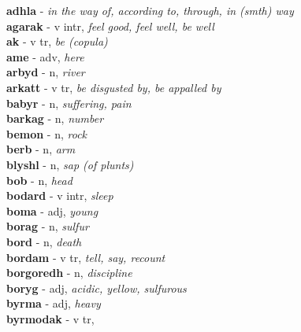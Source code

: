 \textbf{adhla}   - \emph{in the way of, according to, through, in (smth) way}\\ \vspace{7pt}\textbf{agarak}   - v intr, \emph{feel good, feel well, be well}\\ \vspace{7pt}\textbf{ak}   - v tr, \emph{be (copula)}\\ \vspace{7pt}\textbf{ame}   - adv, \emph{here}\\ \vspace{7pt}\textbf{arbyd}   - n, \emph{river}\\ \vspace{7pt}\textbf{arkatt}   - v tr, \emph{be disgusted by, be appalled by}\\ \vspace{7pt}\textbf{babyr}   - n, \emph{suffering, pain}\\ \vspace{7pt}\textbf{barkag}   - n, \emph{number}\\ \vspace{7pt}\textbf{bemon}   - n, \emph{rock}\\ \vspace{7pt}\textbf{berb}   - n, \emph{arm}\\ \vspace{7pt}\textbf{blyshl}   - n, \emph{sap (of plunts)}\\ \vspace{7pt}\textbf{bob}   - n, \emph{head}\\ \vspace{7pt}\textbf{bodard}   - v intr, \emph{sleep}\\ \vspace{7pt}\textbf{boma}   - adj, \emph{young}\\ \vspace{7pt}\textbf{borag}   - n, \emph{sulfur}\\ \vspace{7pt}\textbf{bord}   - n, \emph{death}\\ \vspace{7pt}\textbf{bordam}   - v tr, \emph{tell, say, recount}\\ \vspace{7pt}\textbf{borgoredh}   - n, \emph{discipline}\\ \vspace{7pt}\textbf{boryg}   - adj, \emph{acidic, yellow, sulfurous}\\ \vspace{7pt}\textbf{byrma}   - adj, \emph{heavy}\\ \vspace{7pt}\textbf{byrmodak}   - v tr, 